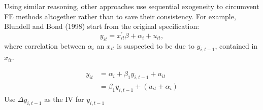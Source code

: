 Using similar reasoning, other approaches use sequential exogeneity to circumvent FE methods 
altogether rather than to save their consistency. 
For example, Blundell and Bond (1998) start from the original specification:
\[y_{it} = x_{it}^{\prime} \beta + \alpha_i + u_{it}, \]
where correlation between $\alpha_{i}$ an $x_{it}$ is suspected to be due to $y_{i,t-1}$, contained in $x_{it}.$

\begin{definition}
    \begin{align*}
        y_{it} &= \alpha _i + \beta_1 y_{i,t-1} + u_{it} \\
        &= \beta_1 y_{i,t-1} + (u_{it} + \alpha_i) 
    \end{align*}
    Use $\Delta y_{i,t-1}$ as the IV for $y_{i,t-1}$
\end{definition}

